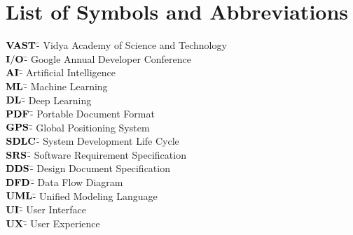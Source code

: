 %
%
%
%
%
%



\chapter*{List of Symbols and Abbreviations}




\begin{tabbing}



\hspace{1cm}\= {$ \bf VAST   $}\quad\= - Vidya Academy of Science and Technology\\[5pt]

\hspace{1cm}\= {$ \bf I/O  $}\quad\= - Google Annual Developer Conference\\[5pt]
\hspace{1cm}\= {$ \bf AI  $}\quad\= - Artificial Intelligence\\[5pt]
\hspace{1cm}\= {$ \bf ML   $}\quad\= - Machine Learning \\[5pt]
\hspace{1cm}\= {$ \bf DL    $}\quad\= - Deep Learning \\[5pt]
\hspace{1cm}\= {$ \bf PDF    $}\quad\= - Portable Document Format\\[5pt]
\hspace{1cm}\= {$ \bf GPS    $}\quad\= - Global Positioning System\\[5pt]
\hspace{1cm}\= {$ \bf SDLC   $}\quad\= - System Development Life Cycle\\[5pt]
\hspace{1cm}\= {$ \bf SRS    $}\quad\= - Software Requirement Specification\\[5pt]
\hspace{1cm}\= {$ \bf DDS    $}\quad\= - Design Document Specification\\[5pt]
\hspace{1cm}\= {$ \bf DFD    $}\quad\= - Data Flow Diagram\\[5pt]
\hspace{1cm}\= {$ \bf UML    $}\quad\= - Unified Modeling Language\\[5pt]
\hspace{1cm}\= {$ \bf UI     $}\quad\= - User Interface\\[5pt]
\hspace{1cm}\= {$ \bf UX     $}\quad\= - User Experience\\[5pt]

\end{tabbing}